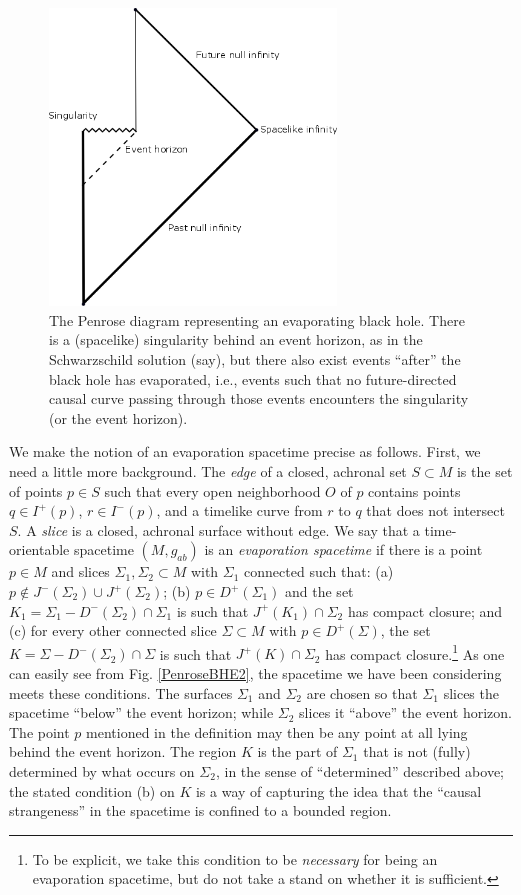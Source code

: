\documentclass[authoryear,12pt,3p]{jowarticle}
\begin{document}
\begin{figure}[h]    \centering
   \includegraphics[width=3in]{BHE_Penrose_Diagram1.png}
   \caption{\label{PenroseBHE1} The Penrose diagram representing an evaporating black hole.  There is a (spacelike) singularity behind an event horizon, as in the Schwarzschild solution (say), but there also exist events ``after'' the black hole has evaporated, i.e., events such that no future-directed causal curve passing through those events encounters the singularity (or the event horizon).}
\end{figure}

We make the notion of an evaporation spacetime precise as follows.  First, we need a little more background.  The \emph{edge} of a closed, achronal set $S\subset M$ is the set of points $p\in S$ such that every open neighborhood $O$ of $p$ contains points $q\in I^+(p)$, $r\in I^-(p)$, and a timelike curve from $r$ to $q$ that does not intersect $S$. A {\em slice} is a closed, achronal surface without edge. We say that a time-orientable spacetime $(M,g_{ab})$ is an \emph{evaporation spacetime} if there is a point $p \in M$ and slices $\Sigma_1, \Sigma_2 \subset M$ with $\Sigma_1$ connected such that: (a) $p\not\in J^-(\Sigma_2)\cup J^+(\Sigma_2)$; (b) $p\in D^+(\Sigma_1)$ and the set $K_1=\Sigma_1-D^-(\Sigma_2)\cap \Sigma_1$ is such that $J^+(K_1)\cap\Sigma_2$ has compact closure; and (c) for every other connected slice $\Sigma \subset M$ with $p\in D^+(\Sigma)$, the set $K=\Sigma-D^-(\Sigma_2)\cap \Sigma$ is such that $J^+(K)\cap\Sigma_2$ has compact closure.\footnote{To be explicit, we take this condition to be \emph{necessary} for being an evaporation spacetime, but do not take a stand on whether it is sufficient.}  As one can easily see from Fig. \ref{PenroseBHE2}, the spacetime we have been considering meets these conditions.  The surfaces $\Sigma_1$ and $\Sigma_2$ are chosen so that $\Sigma_1$ slices the spacetime ``below'' the event horizon; while $\Sigma_2$ slices it ``above'' the event horizon.  The point $p$ mentioned in the definition may then be any point at all lying behind the event horizon.  The region $K$ is the part of $\Sigma_1$ that is not (fully) determined by what occurs on $\Sigma_2$, in the sense of ``determined'' described above; the stated condition (b) on $K$ is a way of capturing the idea that the ``causal strangeness'' in the spacetime is confined to a bounded region.
\end{document}

